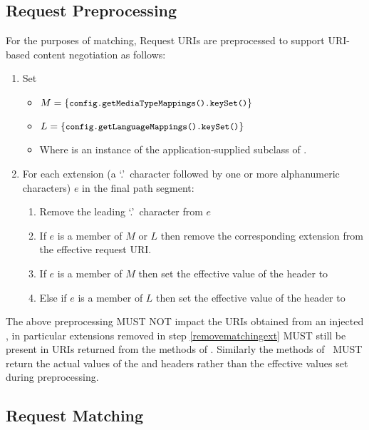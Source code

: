\subsection{Request Preprocessing}

For the purposes of matching, Request URIs are preprocessed to support URI-based content negotiation as follows:

\begin{enumerate}
\item Set
\begin{itemize}
\item $M = \{\mbox{\texttt{\small config.getMediaTypeMappings().keySet()}}\}$
\item $L = \{\mbox{\texttt{\small config.getLanguageMappings().keySet()}}\}$
\item Where  is an instance of the application-supplied subclass of .
\end{itemize}
\item For each extension (a \lq.\rq\ character followed by one or more alphanumeric characters) $e$ in the final path segment:
\begin{enumerate}
\item Remove the leading \lq.\rq\ character from $e$
\item\label{removematchingext} If $e$ is a member of $M$ or $L$ then remove the corresponding extension from the effective request URI.
\item If $e$ is a member of $M$ then set the effective value of the  header to 
\item Else if $e$ is a member of $L$ then set the effective value of the  header to 
\end{enumerate}
\end{enumerate}

The above preprocessing MUST NOT impact the URIs obtained from an injected , in particular extensions removed in step \ref{removematchingext} MUST still be present in URIs returned from the methods of \UriInfo. Similarly the methods of \HttpHeaders\ MUST return the actual values of the  and  headers rather than the effective values set during preprocessing.

\subsection{Request Matching}


